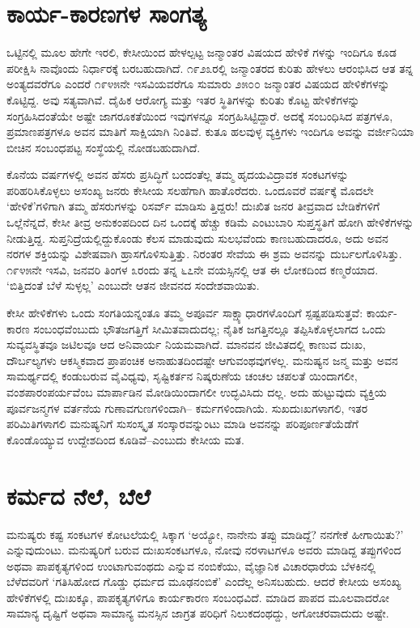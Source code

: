 \section{ಕಾರ್ಯ-ಕಾರಣಗಳ ಸಾಂಗತ್ಯ}

ಒಟ್ಟಿನಲ್ಲಿ ಮೂಲ ಹೇಗೇ ಇರಲಿ, ಕೇಸೀಯಿಂದ ಹೇಳಲ್ಪಟ್ಟ ಜನ್ಮಾಂತರ ವಿಷಯದ ಹೇಳಿಕೆ ಗಳನ್ನು ಇಂದಿಗೂ ಕೂಡ ಪರೀಕ್ಷಿಸಿ ನಾವೊಂದು ನಿರ್ಧಾರಕ್ಕೆ ಬರಬಹುದಾಗಿದೆ. ೧೯೨೩ರಲ್ಲಿ ಜನ್ಮಾಂತರದ ಕುರಿತು ಹೇಳಲು ಆರಂಭಿಸಿದ ಆತ ತನ್ನ ಅಂತ್ಯದವರೆಗೂ ಎಂದರೆ ೧೯೪೫ನೇ ಇಸವಿಯವರೆಗೂ ಸುಮಾರು ೨೫೦೦ ಜನ್ಮಾಂತರ ವಿಷಯದ ಹೇಳಿಕೆಗಳನ್ನು ಕೊಟ್ಟಿದ್ದ. ಅವು ಸತ್ಯವಾಗಿವೆ. ದೈಹಿಕ ಆರೋಗ್ಯ ಮತ್ತು ಇತರ ಸ್ಥಿತಿಗಳನ್ನು ಕುರಿತು ಕೊಟ್ಟ ಹೇಳಿಕೆಗಳನ್ನು ಸಂಗ್ರಹಿಸಿದಂತೆಯೇ ಅಷ್ಟೇ ಜಾಗರೂಕತೆಯಿಂದ ಇವುಗಳನ್ನೂ ಸಂಗ್ರಹಿಸಿಟ್ಟಿದ್ದಾರೆ. ಅದಕ್ಕೆ ಸಂಬಂಧಿಸಿದ ಪತ್ರಗಳೂ, ಪ್ರಮಾಣಪತ್ರಗಳೂ ಅವನ ಮಾತಿಗೆ ಸಾಕ್ಷಿಯಾಗಿ ನಿಂತಿವೆ. ಕುತೂ ಹಲವುಳ್ಳ ವ್ಯಕ್ತಿಗಳು ಇಂದಿಗೂ ಅವನ್ನು ವರ್ಜೀನಿಯಾ ಬೀಚಿನ ಸಂಬಂಧಪಟ್ಟ ಸಂಸ್ಥೆಯಲ್ಲಿ ನೋಡಬಹುದಾಗಿದೆ.

ಕೊನೆಯ ವರ್ಷಗಳಲ್ಲಿ ಅವನ ಹೆಸರು ಪ್ರಸಿದ್ಧಿಗೆ ಬಂದಂತೆಲ್ಲ ತಮ್ಮ ಹೃದಯವಿದ್ರಾವಕ ಸಂಕಟಗಳನ್ನು ಪರಿಹರಿಸಿಕೊಳ್ಳಲು ಅಸಂಖ್ಯ ಜನರು ಕೇಸೀಯ ಸಲಹೆಗಾಗಿ ಹಾತೊರೆದರು. ಒಂದೂವರೆ ವರ್ಷಕ್ಕೆ ಮೊದಲೇ ‘ಹೇಳಿಕೆ’ಗಳಿಗಾಗಿ ತಮ್ಮ ಹೆಸರುಗಳನ್ನು ರಿಸರ್ವ್ ಮಾಡಿಸು ತ್ತಿದ್ದರು! ದುಃಖಿತ ಜನರ ತೀವ್ರವಾದ ಬೇಡಿಕೆಗಳಿಗೆ ಒಲ್ಲೆನೆನ್ನದೆ, ಕೇಸೀ ತೀವ್ರ ಅನುಕಂಪದಿಂದ ದಿನ ಒಂದಕ್ಕೆ ಹೆಚ್ಚು ಕಡಿಮೆ ಎಂಟುಬಾರಿ ಸುಪ್ತಸ್ಥತಿಗೆ ಹೋಗಿ ಹೇಳಿಕೆಗಳನ್ನು ನೀಡುತ್ತಿದ್ದ. ಸುಪ್ತನಿದ್ರೆಯಲ್ಲಿದ್ದುಕೊಂಡು ಕೆಲಸ ಮಾಡುವುದು ಸುಲಭವೆಂದು ಕಾಣಬಹುದಾದರೂ, ಅದು ಅವನ ನರಗಳ ಶಕ್ತಿಯನ್ನು ವಿಶೇಷವಾಗಿ ಹ್ರಾಸಗೊಳಿಸುತ್ತಿತ್ತು. ನಿರಂತರ ಸೇವೆಯ ಈ ಶ್ರಮ ಅವನನ್ನು ದುರ್ಬಲಗೊಳಿಸಿತ್ತು. ೧೯೪೫ನೇ ಇಸವಿ, ಜನವರಿ ತಿಂಗಳ ೩ರಂದು ತನ್ನ ೬೭ನೇ ವಯಸ್ಸಿನಲ್ಲಿ ಆತ ಈ ಲೋಕದಿಂದ ಕಣ್ಮರೆಯಾದ. ‘ಬಿತ್ತಿದಂತೆ ಬೆಳೆ ಸುಳ್ಳಲ್ಲ’ ಎಂಬುದೇ ಆತನ ಜೀವನದ ಸಂದೇಶವಾಯಿತು.

ಕೇಸೀ ಹೇಳಿಕೆಗಳು ಒಂದು ಸಂಗತಿಯನ್ನಂತೂ ತಮ್ಮ ಅಪೂರ್ವ ಸಾಕ್ಷ್ಯಾಧಾರಗಳೊಂದಿಗೆ ಸ್ಪಷ್ಟಪಡಿಸುತ್ತವೆ: ಕಾರ್ಯ-ಕಾರಣ ಸಂಬಂಧವೆಂಬುದು ಭೌತಜಗತ್ತಿಗೆ ಸೀಮಿತವಾದುದಲ್ಲ; ನೈತಿಕ ಜಗತ್ತಿನಲ್ಲೂ ತಪ್ಪಿಸಿಕೊಳ್ಳಲಾಗದ ಒಂದು ಸುವ್ಯವಸ್ಥಿತವೂ ಜಟಿಲವೂ ಆದ ಅನಿವಾರ್ಯ ನಿಯಮವಾಗಿದೆ. ಮಾನವನ ಜೀವಿತದಲ್ಲಿ ಕಾಣುವ ದುಃಖ, ದೌರ್ಬಲ್ಯಗಳು ಆಕಸ್ಮಿಕವಾದ ಪ್ರಾಪಂಚಿಕ ಅನಾಹುತದಿಂದಷ್ಟೇ ಆಗುವಂಥವುಗಳಲ್ಲ. ಮನುಷ್ಯನ ಜನ್ಮ ಮತ್ತು ಅವನ ಸಾಮರ್ಥ್ಯದಲ್ಲಿ ಕಂಡುಬರುವ ವೈವಿಧ್ಯವು, ಸೃಷ್ಟಿಕರ್ತನ ನಿಷ್ಕರುಣೆಯ ಚಂಚಲ ಚಪಲತೆ ಯಿಂದಾಗಲೀ, ವಂಶಪಾರಂಪರ್ಯವೆಂಬ ಮಾರ್ಪಾಡಿನ ಮೋಡಿಯಿಂದಾಗಲೀ ಉದ್ಭವಿಸಿದು ದಲ್ಲ. ಅದು ಹುಟ್ಟುವುದು ವ್ಯಕ್ತಿಯ ಪೂರ್ವಜನ್ಮಗಳ ವರ್ತನೆಯ ಗುಣಾವಗುಣಗಳಿಂದಾಗಿ– ಕರ್ಮಗಳಿಂದಾಗಿಯೆ. ಸುಖದುಃಖಗಳಾಗಲಿ, ಇತರ ಪರಿಮಿತಿಗಳಾಗಲಿ ಮನುಷ್ಯನಿಗೆ ಸುಸಂಸ್ಕೃತ ಸಂಸ್ಕಾರವನ್ನುಂಟು ಮಾಡಿ ಅವನನ್ನು ಪರಿಪೂರ್ಣತೆಯೆಡೆಗೆ ಕೊಂಡೊಯ್ಯುವ ಉದ್ದೇಶದಿಂದ ಕೂಡಿವೆ–ಎಂಬುದು ಕೇಸೀಯ ಮತ.


\section{ಕರ್ಮದ ನೆಲೆ, ಬೆಲೆ}

ಮನುಷ್ಯರು ಕಷ್ಟ ಸಂಕಟಗಳ ಕೋಟಲೆಯಲ್ಲಿ ಸಿಕ್ಕಾಗ ‘ಅಯ್ಯೋ, ನಾನೇನು ತಪ್ಪು ಮಾಡಿದ್ದೆ? ನನಗೇಕೆ ಹೀಗಾಯಿತು?’ ಎನ್ನುವುದುಂಟು. ಮನುಷ್ಯರಿಗೆ ಬರುವ ದುಃಖಸಂಕಟಗಳೂ, ನೋವು ನರಳಾಟಗಳೂ ಅವರು ಮಾಡಿದ್ದ ತಪ್ಪುಗಳಿಂದ ಅಥವಾ ಪಾಪಕೃತ್ಯಗಳಿಂದ ಉಂಟಾಗುವಂಥದು ಎನ್ನುವ ನಂಬಿಕೆಯು, ವೈಜ್ಞಾನಿಕ ವಿಚಾರಧಾರೆಯ ಬೆಳಕಿನಲ್ಲಿ ಬೆಳೆದವರಿಗೆ ‘ಗತಿಸಿಹೋದ ಗೊಡ್ಡು ಧರ್ಮದ ಮೂಢನಂಬಿಕೆ’ ಎಂದೆಲ್ಲ ಅನಿಸಬಹುದು. ಆದರೆ ಕೇಸೀಯ ಅಸಂಖ್ಯ ಹೇಳಿಕೆಗಳಲ್ಲಿ ದುಃಖಕ್ಕೂ, ಪಾಪಕೃತ್ಯಗಳಿಗೂ ಕಾರ್ಯಕಾರಣ ಸಂಬಂಧವಿದೆ. ಮಾಡಿದ ಪಾಪದ ಮೂಲವಾದರೋ ಸಾಮಾನ್ಯ ದೃಷ್ಟಿಗೆ ಅಥವಾ ಸಾಮಾನ್ಯ ಮನಸ್ಸಿನ ಜಾಗ್ರತ ಪರಿಧಿಗೆ ನಿಲುಕದಂಥದ್ದು, ಅಗೋಚರವಾದುದು ಅಷ್ಟೇ.

